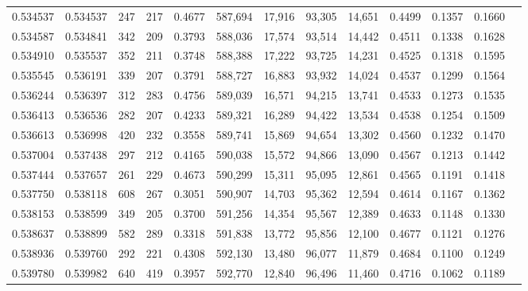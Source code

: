 \begin{tabular}{rrrrrrrrrrrrr}
0.534537 & 0.534537 &    247 &   217 &                                     0.4677 & 587,694 &  17,916 &  93,305 &  14,651 & 0.4499 & 0.1357 & 0.1660 \\
0.534587 & 0.534841 &    342 &   209 &                                     0.3793 & 588,036 &  17,574 &  93,514 &  14,442 & 0.4511 & 0.1338 & 0.1628 \\
0.534910 & 0.535537 &    352 &   211 &                                     0.3748 & 588,388 &  17,222 &  93,725 &  14,231 & 0.4525 & 0.1318 & 0.1595 \\
0.535545 & 0.536191 &    339 &   207 &                                     0.3791 & 588,727 &  16,883 &  93,932 &  14,024 & 0.4537 & 0.1299 & 0.1564 \\
0.536244 & 0.536397 &    312 &   283 &                                     0.4756 & 589,039 &  16,571 &  94,215 &  13,741 & 0.4533 & 0.1273 & 0.1535 \\
0.536413 & 0.536536 &    282 &   207 &                                     0.4233 & 589,321 &  16,289 &  94,422 &  13,534 & 0.4538 & 0.1254 & 0.1509 \\
0.536613 & 0.536998 &    420 &   232 &                                     0.3558 & 589,741 &  15,869 &  94,654 &  13,302 & 0.4560 & 0.1232 & 0.1470 \\
0.537004 & 0.537438 &    297 &   212 &                                     0.4165 & 590,038 &  15,572 &  94,866 &  13,090 & 0.4567 & 0.1213 & 0.1442 \\
0.537444 & 0.537657 &    261 &   229 &                                     0.4673 & 590,299 &  15,311 &  95,095 &  12,861 & 0.4565 & 0.1191 & 0.1418 \\
0.537750 & 0.538118 &    608 &   267 &                                     0.3051 & 590,907 &  14,703 &  95,362 &  12,594 & 0.4614 & 0.1167 & 0.1362 \\
0.538153 & 0.538599 &    349 &   205 &                                     0.3700 & 591,256 &  14,354 &  95,567 &  12,389 & 0.4633 & 0.1148 & 0.1330 \\
0.538637 & 0.538899 &    582 &   289 &                                     0.3318 & 591,838 &  13,772 &  95,856 &  12,100 & 0.4677 & 0.1121 & 0.1276 \\
0.538936 & 0.539760 &    292 &   221 &                                     0.4308 & 592,130 &  13,480 &  96,077 &  11,879 & 0.4684 & 0.1100 & 0.1249 \\
0.539780 & 0.539982 &    640 &   419 &                                     0.3957 & 592,770 &  12,840 &  96,496 &  11,460 & 0.4716 & 0.1062 & 0.1189 \\

\end{tabular}
